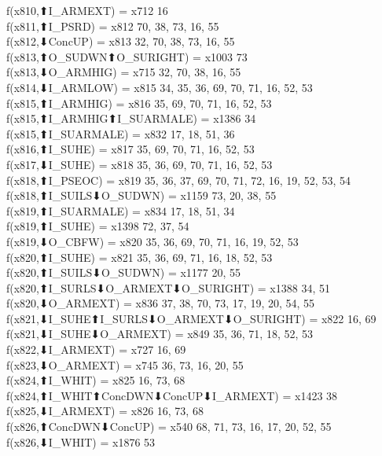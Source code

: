 f(x810,⬆I_ARMEXT) = x712 {16} \\
f(x811,⬆I_PSRD) = x812 {70, 38, 73, 16, 55} \\
f(x812,⬇ConcUP) = x813 {32, 70, 38, 73, 16, 55} \\
f(x813,⬆O_SUDWN⬆O_SURIGHT) = x1003 {73} \\
f(x813,⬇O_ARMHIG) = x715 {32, 70, 38, 16, 55} \\
f(x814,⬇I_ARMLOW) = x815 {34, 35, 36, 69, 70, 71, 16, 52, 53} \\
f(x815,⬆I_ARMHIG) = x816 {35, 69, 70, 71, 16, 52, 53} \\
f(x815,⬆I_ARMHIG⬆I_SUARMALE) = x1386 {34} \\
f(x815,⬆I_SUARMALE) = x832 {17, 18, 51, 36} \\
f(x816,⬆I_SUHE) = x817 {35, 69, 70, 71, 16, 52, 53} \\
f(x817,⬇I_SUHE) = x818 {35, 36, 69, 70, 71, 16, 52, 53} \\
f(x818,⬆I_PSEOC) = x819 {35, 36, 37, 69, 70, 71, 72, 16, 19, 52, 53, 54} \\
f(x818,⬆I_SUILS⬇O_SUDWN) = x1159 {73, 20, 38, 55} \\
f(x819,⬆I_SUARMALE) = x834 {17, 18, 51, 34} \\
f(x819,⬆I_SUHE) = x1398 {72, 37, 54} \\
f(x819,⬇O_CBFW) = x820 {35, 36, 69, 70, 71, 16, 19, 52, 53} \\
f(x820,⬆I_SUHE) = x821 {35, 36, 69, 71, 16, 18, 52, 53} \\
f(x820,⬆I_SUILS⬇O_SUDWN) = x1177 {20, 55} \\
f(x820,⬆I_SURLS⬇O_ARMEXT⬇O_SURIGHT) = x1388 {34, 51} \\
f(x820,⬇O_ARMEXT) = x836 {37, 38, 70, 73, 17, 19, 20, 54, 55} \\
f(x821,⬇I_SUHE⬆I_SURLS⬇O_ARMEXT⬇O_SURIGHT) = x822 {16, 69} \\
f(x821,⬇I_SUHE⬇O_ARMEXT) = x849 {35, 36, 71, 18, 52, 53} \\
f(x822,⬇I_ARMEXT) = x727 {16, 69} \\
f(x823,⬇O_ARMEXT) = x745 {36, 73, 16, 20, 55} \\
f(x824,⬆I_WHIT) = x825 {16, 73, 68} \\
f(x824,⬆I_WHIT⬆ConcDWN⬇ConcUP⬇I_ARMEXT) = x1423 {38} \\
f(x825,⬇I_ARMEXT) = x826 {16, 73, 68} \\
f(x826,⬆ConcDWN⬇ConcUP) = x540 {68, 71, 73, 16, 17, 20, 52, 55} \\
f(x826,⬇I_WHIT) = x1876 {53} \\
